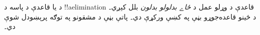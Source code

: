 \documentclass[../../../include/open-logic-section]{subfiles}
\begin{document}
د \Elim{\lor} يا \Elim{\lexists} قاعدې د پاسه د
!!a{elimination} قاعدې د وړلو عمل د \emph{ځاے بدلولو بدلون}
بلل کېږي۔ د ځينو قاعده‌جوړو بڼې په
 کښې ورکړې دي۔ پاتې بڼې
د مشقونو په توګه پرېښودل شوې دي۔

\end{document}
